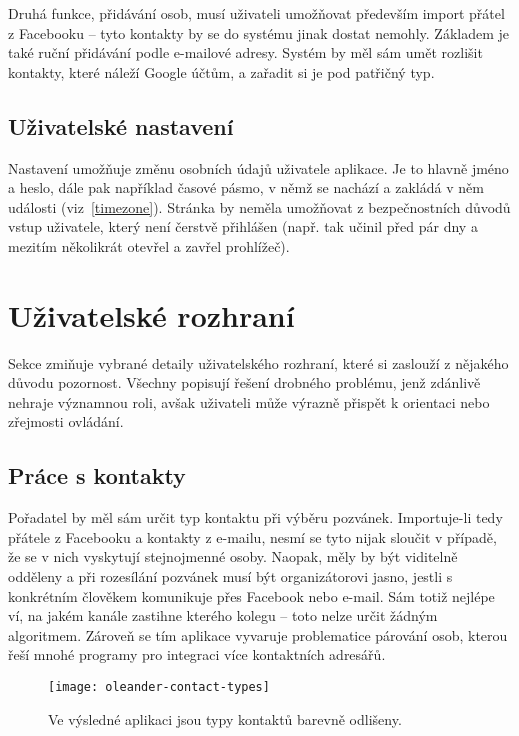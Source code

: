 \documentclass[12pt,oneside,final]{fithesis2}
\begin{document}
Druhá funkce, přidávání osob, musí uživateli umožňovat především import přátel z Facebooku -- tyto kontakty by se do systému jinak dostat nemohly. Základem je také ruční přidávání podle e-mailové adresy. Systém by měl sám umět rozlišit kontakty, které náleží Google účtům, a zařadit si je pod patřičný typ.

\subsection{Uživatelské nastavení}
Nastavení umožňuje změnu osobních údajů uživatele aplikace. Je to hlavně jméno a heslo, dále pak například časové pásmo, v němž se nachází a zakládá v něm události (viz~\ref{timezone}). Stránka by neměla umožňovat z bezpečnostních důvodů vstup uživatele, který není čerstvě přihlášen (např. tak učinil před pár dny a mezitím několikrát otevřel a zavřel prohlížeč).


\section{Uživatelské rozhraní}
Sekce zmiňuje vybrané detaily uživatelského rozhraní, které si zaslouží z nějakého důvodu pozornost. Všechny popisují řešení drobného problému, jenž zdánlivě nehraje významnou roli, avšak uživateli může výrazně přispět k orientaci nebo zřejmosti ovládání.

\subsection{Práce s kontakty}\label{separateContactTypes}
Pořadatel by měl sám určit typ kontaktu při výběru pozvánek. Im\-por\-tu\-je-li tedy přátele z Facebooku a kontakty z e-mailu, nesmí se tyto nijak sloučit v případě, že se v nich vyskytují stejnojmenné osoby. Naopak, měly by být viditelně odděleny a při rozesílání pozvánek musí být organizátorovi jasno, jestli s konkrétním člověkem komunikuje přes Facebook nebo e-mail. Sám totiž nejlépe ví, na jakém kanále zastihne kterého kolegu -- toto nelze určit žádným algoritmem. Zároveň se tím aplikace vyvaruje problematice párování osob, kterou řeší mnohé programy pro integraci více kontaktních adresářů.

\begin{figure}[H]
    \centering
    \texttt{[image: oleander-contact-types]}
    \caption{Ve výsledné aplikaci jsou typy kontaktů barevně odlišeny.}
\end{figure}
\end{document}
